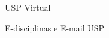 \begin{secao}{USP Virtual}
\begin{subsecao}{E-disciplinas e E-mail USP}
%
%
%
%
%

\end{subsecao}
\end{secao}
